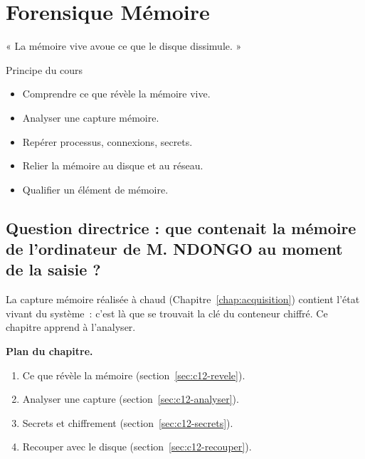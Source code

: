 
\chapter{Forensique Mémoire}
\label{chap:memoire}

\epigraph{%
    « La mémoire vive avoue ce que le disque dissimule. »%
}{Principe du cours}


\begin{boxobjectifs}
\begin{itemize}
    \item Comprendre ce que révèle la mémoire vive.
    \item Analyser une capture mémoire.
    \item Repérer processus, connexions, secrets.
    \item Relier la mémoire au disque et au réseau.
    \item Qualifier un élément de mémoire.
\end{itemize}
\end{boxobjectifs}

\bigskip

\section*{Question directrice : que contenait la mémoire de l'ordinateur de M. NDONGO au moment de la saisie ?}

La capture mémoire réalisée à chaud (Chapitre~\ref{chap:acquisition}) contient
l'état vivant du système~: c'est là que se trouvait la clé du conteneur
chiffré. Ce chapitre apprend à l'analyser.

\medskip
\textbf{Plan du chapitre.}
\begin{enumerate}
    \item Ce que révèle la mémoire (section~\ref{sec:c12-revele}).
    \item Analyser une capture (section~\ref{sec:c12-analyser}).
    \item Secrets et chiffrement (section~\ref{sec:c12-secrets}).
    \item Recouper avec le disque (section~\ref{sec:c12-recouper}).
\end{enumerate}


